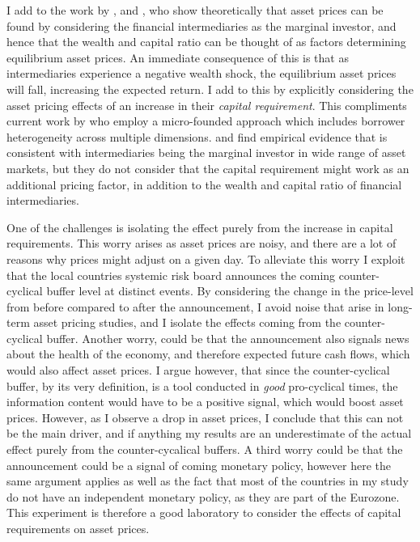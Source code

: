 \documentclass[11pt]{article}
\let\cite=\citet
\begin{document}
I add to the work by \citet{Brunnermeier2009}, \citet{He2013} and \citet{Brunnermeier2014}, who show theoretically that asset prices can be found by considering the financial intermediaries as the marginal investor, and hence that the wealth and capital ratio can be thought of as factors determining equilibrium asset prices. An immediate consequence of this is that as intermediaries experience a negative wealth shock, the equilibrium asset prices will fall, increasing the expected return. I add to this by explicitly considering the asset pricing effects of an increase in their \emph{capital requirement}. This compliments current work by \cite{harris2018aggregate} who employ a micro-founded approach which includes borrower heterogeneity across multiple dimensions. \citet{Adrian2014} and \citet{He2017} find empirical evidence that is consistent with intermediaries being the marginal investor in wide range of asset markets, but they do not consider that the capital requirement might work as an additional pricing factor, in addition to the wealth and capital ratio of financial intermediaries.

One of the challenges is isolating the effect purely from the increase in capital requirements. This worry arises as asset prices are noisy, and there are a lot of reasons why prices might adjust on a given day. To alleviate this worry I exploit that the local countries systemic risk board announces the coming counter-cyclical buffer level at distinct events. By considering the change in the price-level from before compared to after the announcement, I avoid noise that arise in long-term asset pricing studies, and I isolate the effects coming from the counter-cyclical buffer. Another worry, could be that the announcement also signals news about the health of the economy, and therefore expected future cash flows, which would also affect asset prices. I argue however, that since the counter-cyclical buffer, by its very definition, is a tool conducted in \emph{good} pro-cyclical times, the information content would have to be a positive signal, which would boost asset prices. However, as I observe a drop in asset prices, I conclude that this can not be the main driver, and if anything my results are an underestimate of the actual effect purely from the counter-cycalical buffers. A third worry could be that the announcement could be a signal of coming monetary policy, however here the same argument applies as well as the fact that most of the countries in my study do not have an independent monetary policy, as they are part of the Eurozone. This experiment is therefore a good laboratory to consider the effects of capital requirements on asset prices.
\end{document}

